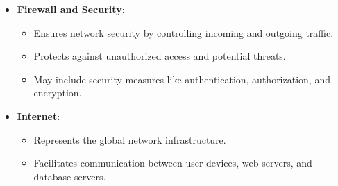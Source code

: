 \documentclass[a4paper, 12pt]{article}
\begin{document}
\begin{itemize}
    \item \textbf{Firewall and Security}:
    \begin{itemize}
        \item Ensures network security by controlling incoming and outgoing traffic.
        \item Protects against unauthorized access and potential threats.
        \item May include security measures like authentication, authorization, and encryption.
    \end{itemize}
    
    \item \textbf{Internet}:
    \begin{itemize}
        \item Represents the global network infrastructure.
        \item Facilitates communication between user devices, web servers, and database servers.
    \end{itemize}
\end{itemize}

\newpage
\end{document}

